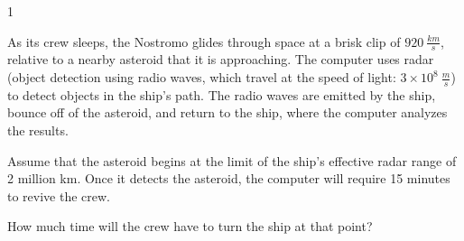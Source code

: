 
\AddToShipoutPicture*{\BackgroundPic}

\addtocounter {ProbNum} {1}

 
{\bf \Large{}} As its crew sleeps, the Nostromo glides through space at a brisk clip of ${920~\tfrac{km}{s}}$, relative to a nearby asteroid that it is approaching.  The computer uses radar (object detection using radio waves, which travel at the speed of light: ${3 \times 10^8 ~\tfrac{m}{s}}$) to detect objects in the ship's path.  The radio waves are emitted by the ship, bounce off of the asteroid, and return to the ship, where the computer analyzes the results.

\bigskip
Assume that the asteroid begins at the limit of the ship's effective radar range of 2 million km.  Once it detects the asteroid, the computer will require 15 minutes to revive the crew.  

\bigskip

How much time will the crew have to turn the ship at that point?

\vfill

\newpage
